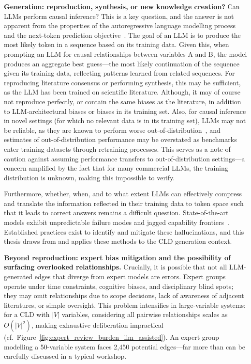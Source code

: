 \medskip
\noindent
\textbf{Generation: reproduction, synthesis, or new knowledge creation?} Can LLMs perform causal inference? This is a key question, and the answer is not apparent from the properties of the autoregressive language modelling process and the next-token prediction objective~\citep{zecevic2023causalparrots}. The goal of an LLM is to produce the most likely token in a sequence based on its training data. Given this, when prompting an LLM for causal relationships between variables A and B, the model produces an aggregate best guess---the most likely continuation of the sequence given its training data, reflecting patterns learned from related sequences. For reproducing literature consensus or performing synthesis, this may be sufficient, as the LLM has been trained on scientific literature. Although, it may of course not reproduce perfectly, or contain the same biases as the literature, in addition to LLM-architectural biases or biases in its training set. Also, for causal inference in novel settings (for which no relevant data is in its training set), LLMs may not be reliable, as they are known to perform worse out-of-distribution~\citep{jin2023cladder, joshi2024causalfallacies}, and estimates of out-of-distribution performance may be overstated as benchmarks enter training datasets through retraining processes. This serves as a note of caution against assuming performance transfers to out-of-distribution settings---a concern amplified by the fact that for many commercial LLMs, the training distribution is unknown, making this impossible to verify.

Furthermore, whether, when, and to what extent LLMs can effectively compress and translate the information reflected in their training data to token space such that it leads to correct answers remains a difficult question. State-of-the-art models exhibit unpredictable failure modes and jagged capability frontiers~\citep{kiciman2024causal}. Established practices exist to identify and mitigate these hallucinations, and this thesis draws from and applies these methods to the CLD generation context.

\medskip
\noindent
\textbf{Beyond reproduction: expert bias mitigation and the possibility of surfacing overlooked relationships.} Crucially, it is possible that not all LLM-generated edges that diverge from expert models are errors. Expert groups operate under time constraints, cognitive biases, and disciplinary blind spots; they may omit relationships due to scope decisions, lack of awareness of adjacent literatures, or simple oversight. This problem intensifies in large-variable systems: for a CLD with $|V|$ variables, considering all pairwise relationships scales as $O(|V|^2)$, making exhaustive deliberation impractical (cf.\ Figure~\ref{fig:expert_review_burden_llm_assisted}). An expert group modelling a 50-variable system faces 2,450 potential edges---far more than can be carefully discussed in a typical workshop.

